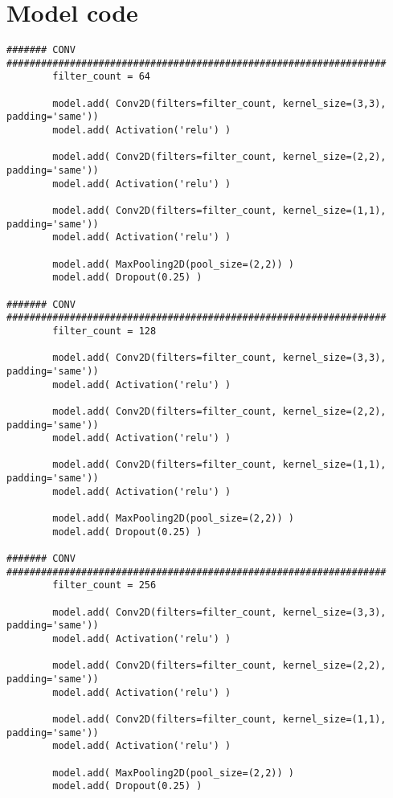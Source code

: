 \section{Model code}\label{sec:model}
\begin{verbatim}
####### CONV ##################################################################
        filter_count = 64

        model.add( Conv2D(filters=filter_count, kernel_size=(3,3), padding='same'))
        model.add( Activation('relu') )

        model.add( Conv2D(filters=filter_count, kernel_size=(2,2), padding='same'))
        model.add( Activation('relu') )

        model.add( Conv2D(filters=filter_count, kernel_size=(1,1), padding='same'))
        model.add( Activation('relu') )

        model.add( MaxPooling2D(pool_size=(2,2)) )
        model.add( Dropout(0.25) )

####### CONV ##################################################################
        filter_count = 128

        model.add( Conv2D(filters=filter_count, kernel_size=(3,3), padding='same'))
        model.add( Activation('relu') )

        model.add( Conv2D(filters=filter_count, kernel_size=(2,2), padding='same'))
        model.add( Activation('relu') )

        model.add( Conv2D(filters=filter_count, kernel_size=(1,1), padding='same'))
        model.add( Activation('relu') )

        model.add( MaxPooling2D(pool_size=(2,2)) )
        model.add( Dropout(0.25) )

####### CONV ##################################################################
        filter_count = 256

        model.add( Conv2D(filters=filter_count, kernel_size=(3,3), padding='same'))
        model.add( Activation('relu') )

        model.add( Conv2D(filters=filter_count, kernel_size=(2,2), padding='same'))
        model.add( Activation('relu') )

        model.add( Conv2D(filters=filter_count, kernel_size=(1,1), padding='same'))
        model.add( Activation('relu') )

        model.add( MaxPooling2D(pool_size=(2,2)) )
        model.add( Dropout(0.25) )
\end{verbatim}
\pagebreak
